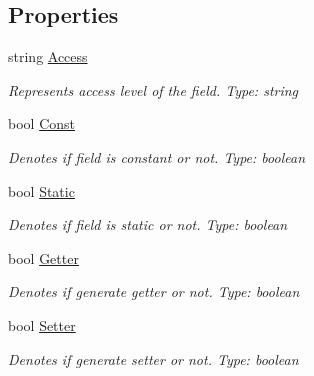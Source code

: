 \subsection*{Properties}
\begin{DoxyCompactItemize}
\item 
string \mbox{\hyperlink{classCodeGen_1_1generators_1_1Field_a49f206d40214424a35eefb0704371ad0}{Access}}
\begin{DoxyCompactList}\small\item\em Represents access level of the field. Type\+: string \end{DoxyCompactList}\item 
bool \mbox{\hyperlink{classCodeGen_1_1generators_1_1Field_a13e03701c6d0b16e3ad7bdeda05a33aa}{Const}}
\begin{DoxyCompactList}\small\item\em Denotes if field is constant or not. Type\+: boolean \end{DoxyCompactList}\item 
bool \mbox{\hyperlink{classCodeGen_1_1generators_1_1Field_a09f180833f4cf101aa0b4183407d7a80}{Static}}
\begin{DoxyCompactList}\small\item\em Denotes if field is static or not. Type\+: boolean \end{DoxyCompactList}\item 
bool \mbox{\hyperlink{classCodeGen_1_1generators_1_1Field_aca6981cbfa9b6b370daef12a42e22662}{Getter}}
\begin{DoxyCompactList}\small\item\em Denotes if generate getter or not. Type\+: boolean \end{DoxyCompactList}\item 
bool \mbox{\hyperlink{classCodeGen_1_1generators_1_1Field_ad57a32f584421475ceb3c929e56b20f9}{Setter}}
\begin{DoxyCompactList}\small\item\em Denotes if generate setter or not. Type\+: boolean \end{DoxyCompactList}\end{DoxyCompactItemize}


